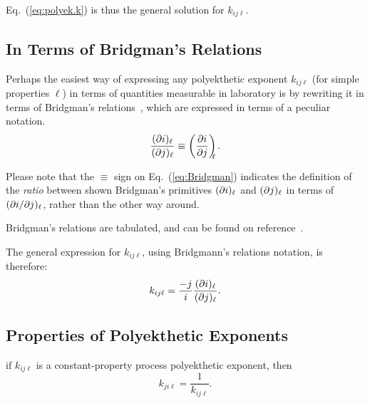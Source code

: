     Eq.~(\ref{eq:polyek.k}) is thus the general solution for $k_{ij\ell}$.

    \subsection{In Terms of Bridgman's Relations}

    Perhaps the easiest way of expressing any polyekthetic  exponent  $k_{ij\ell}$  (for  simple
    properties $\ell$) in terms of quantities measurable in laboratory is  by  rewriting  it  in
    terms of Bridgman's relations~\cite{2006-BejanA-Wiley}, which are expressed in  terms  of  a
    peculiar notation.
    \begin{equation}
        \frac{(\partial {{i}})_{{\ell}}}{(\partial {{j}})_{{\ell}}} \equiv \left(\frac{\partial {{i}}}{\partial {{j}}}\right)_{\!\!\!{\ell}}.
        \label{eq:Bridgman}
    \end{equation}

    Please note that the $\equiv$ sign on Eq.~(\ref{eq:Bridgman}) indicates  the  definition  of
    the \emph{ratio} between shown Bridgman's primitives $(\partial {{i}})_{{\ell}}$ and $(\partial {{j}})_{{\ell}}$ in  terms
    of $({\partial {{i}}}/{\partial {{j}}})_{{\ell}}$, rather than the other way around.

    Bridgman's relations are tabulated, and can be found on reference~\cite{2006-BejanA-Wiley}.

    The general expression for $k_{ij\ell}$, using Bridgmann's relations notation, is therefore:
    \begin{equation}
        k_{ij\ell} = \frac{-j}{i}\frac{(\partial {{i}})_{{\ell}}}{(\partial {{j}})_{{\ell}}}.
        \label{eq:k.bri}
    \end{equation}

    \subsection{Properties of Polyekthetic Exponents}

    \begin{theorem}\label{the:k.recip}
        if $k_{ij\ell}$ is a constant-property process polyekthetic exponent, then
        \begin{equation}
            k_{ji\ell} = \frac{1}{k_{ij\ell}}.
            \label{eq:k.recipr}
        \end{equation}
    \end{theorem}

